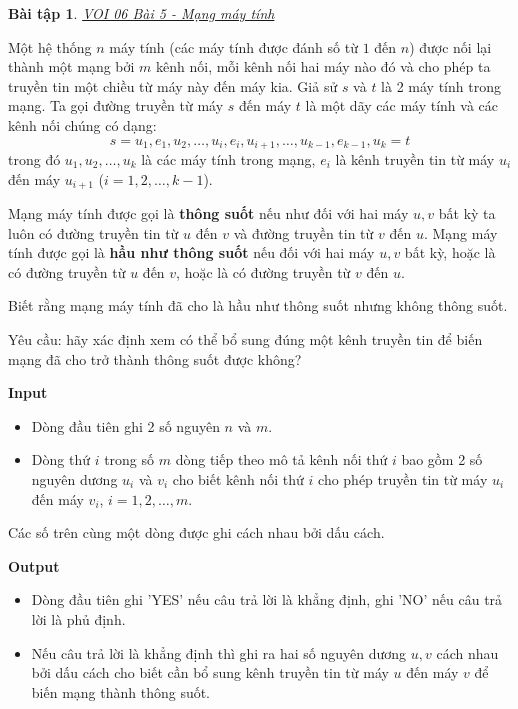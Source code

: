 \documentclass{article}
\newtheorem{baitap}{Bài tập}
\begin{document}
\begin{baitap}
    \href{https://oj.vnoi.info/problem/nkonearc}{VOI 06 Bài 5 - Mạng máy tính}
\end{baitap}

Một hệ thống $n$ máy tính (các máy tính được đánh số từ $1$ đến $n$) được nối lại thành một mạng bởi $m$ kênh nối, mỗi kênh nối hai máy nào đó và cho phép ta truyền tin một chiều từ máy này đến máy kia. Giả sử $s$ và $t$ là 2 máy tính trong mạng. Ta gọi đường truyền từ máy $s$ đến máy $t$ là một dãy các máy tính và các kênh nối chúng có dạng:
\[
s = u_1, e_1, u_2, \ldots, u_i, e_i, u_{i+1}, \ldots, u_{k-1}, e_{k-1}, u_k = t
\]
trong đó $u_1, u_2, \ldots, u_k$ là các máy tính trong mạng, $e_i$ là kênh truyền tin từ máy $u_i$ đến máy $u_{i+1}$ ($i = 1, 2, \ldots, k-1$).

Mạng máy tính được gọi là \textbf{thông suốt} nếu như đối với hai máy $u, v$ bất kỳ ta luôn có đường truyền tin từ $u$ đến $v$ và đường truyền tin từ $v$ đến $u$. Mạng máy tính được gọi là \textbf{hầu như thông suốt} nếu đối với hai máy $u, v$ bất kỳ, hoặc là có đường truyền từ $u$ đến $v$, hoặc là có đường truyền từ $v$ đến $u$.

Biết rằng mạng máy tính đã cho là hầu như thông suốt nhưng không thông suốt.

Yêu cầu: hãy xác định xem có thể bổ sung đúng một kênh truyền tin để biến mạng đã cho trở thành thông suốt được không?

\textbf{Input}
\begin{itemize}
    \item Dòng đầu tiên ghi 2 số nguyên $n$ và $m$.
    \item Dòng thứ $i$ trong số $m$ dòng tiếp theo mô tả kênh nối thứ $i$ bao gồm 2 số nguyên dương $u_i$ và $v_i$ cho biết kênh nối thứ $i$ cho phép truyền tin từ máy $u_i$ đến máy $v_i$, $i = 1, 2, \ldots, m$.
\end{itemize}
Các số trên cùng một dòng được ghi cách nhau bởi dấu cách.

\textbf{Output}
\begin{itemize}
    \item Dòng đầu tiên ghi 'YES' nếu câu trả lời là khẳng định, ghi 'NO' nếu câu trả lời là phủ định.
    \item Nếu câu trả lời là khẳng định thì ghi ra hai số nguyên dương $u, v$ cách nhau bởi dấu cách cho biết cần bổ sung kênh truyền tin từ máy $u$ đến máy $v$ để biến mạng thành thông suốt.
\end{itemize}
\end{document}
